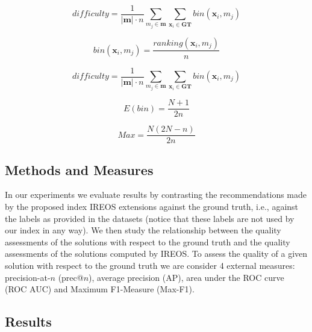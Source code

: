 \begin{equation}
difficulty = \frac{1}{|\mathbf{m}| \cdot n} \sum_{m_j \in \mathbf{m}} \sum_{\mathbf{x}_i \in \mathbf{GT}} bin(\mathbf{x}_i, m_j)
\end{equation}

\begin{equation}
bin(\mathbf{x}_i, m_j) = \frac{ranking(\mathbf{x}_i, m_j)}{n}
\end{equation}

\begin{equation}
difficulty = \frac{1}{|\mathbf{m}| \cdot n} \sum_{m_j \in \mathbf{m}} \sum_{\mathbf{x}_i \in \mathbf{GT}} bin(\mathbf{x}_i, m_j)
\end{equation}

\begin{equation}
E(bin) = \frac{N + 1}{2n}
\end{equation}

\begin{equation}
Max = \frac{N(2N - n)}{2n}
\end{equation}


\subsection{Methods and Measures}
In our experiments we evaluate results by contrasting the recommendations made by the proposed index IREOS extensions against the ground truth, i.e., against the labels as provided in the datasets (notice that these labels are not used by our index in any way). We then study the relationship between the quality assessments of the solutions with respect to the ground truth and the quality assessments of the solutions computed by IREOS. To assess the quality of a given solution with respect to the ground truth we are consider 4 external measures: precision-at-$n$ (prec@$n$), average precision (AP), area under the ROC curve (ROC AUC) and Maximum F1-Measure (Max-F1).

\subsection{Results}


